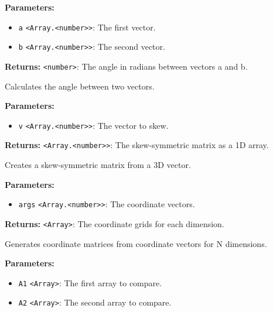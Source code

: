 \documentclass[12pt,a4paper]{article}
\begin{document}
\noindent \textbf{Parameters:}
\begin{itemize}
  \item \texttt{a} \texttt{<Array.<number>>}: The first vector.
  \item \texttt{b} \texttt{<Array.<number>>}: The second vector.
\end{itemize}

\noindent \textbf{Returns:} \texttt{<number>}: The angle in radians between vectors a and b.

\noindent Calculates the angle between two vectors.

\vspace{5mm}
\noindent {}


\noindent \textbf{Parameters:}
\begin{itemize}
  \item \texttt{v} \texttt{<Array.<number>>}: The vector to skew.
\end{itemize}

\noindent \textbf{Returns:} \texttt{<Array.<number>>}: The skew-symmetric matrix as a 1D array.

\noindent Creates a skew-symmetric matrix from a 3D vector.

\vspace{5mm}
\noindent {}


\noindent \textbf{Parameters:}
\begin{itemize}
  \item \texttt{args} \texttt{<Array.<number>>}: The coordinate vectors.
\end{itemize}

\noindent \textbf{Returns:} \texttt{<Array>}: The coordinate grids for each dimension.

\noindent Generates coordinate matrices from coordinate vectors for N dimensions.

\vspace{5mm}
\noindent {}


\noindent \textbf{Parameters:}
\begin{itemize}
  \item \texttt{A1} \texttt{<Array>}: The first array to compare.
  \item \texttt{A2} \texttt{<Array>}: The second array to compare.
\end{itemize}
\end{document}
